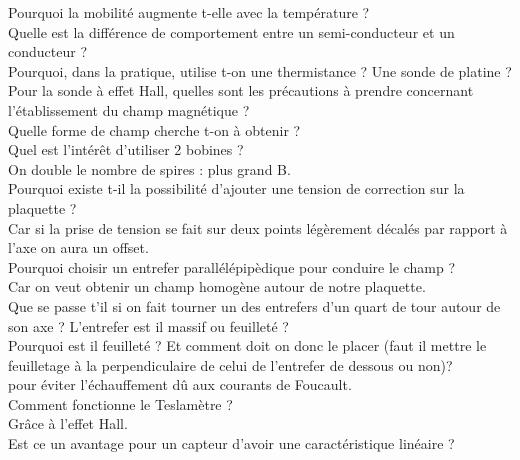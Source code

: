 \documentclass[12pt,prb,aps,epsf]{report}
\begin{document}
Pourquoi la mobilité augmente t-elle avec la température ?\\

Quelle est la différence de comportement entre un semi-conducteur et un conducteur ?\\

Pourquoi, dans la pratique, utilise t-on une thermistance ? Une sonde de platine ?\\

Pour la sonde à effet Hall, quelles sont les précautions à prendre concernant l'établissement du champ magnétique ?\\

Quelle forme de champ cherche t-on à obtenir ?\\

Quel est l'intérêt d'utiliser 2 bobines ?\\
On double le nombre de spires : plus grand B.\\

Pourquoi existe t-il la possibilité d'ajouter une tension de correction sur la plaquette ?\\
Car si la prise de tension se fait sur deux points légèrement décalés par rapport à l'axe on aura un offset.\\

Pourquoi choisir un entrefer parallélépipèdique pour conduire le champ ?\\
Car on veut obtenir un champ homogène autour de notre plaquette.\\

Que se passe t'il si on fait tourner un des entrefers d'un quart de tour autour de son axe ? L'entrefer est il massif ou feuilleté ?\\

Pourquoi est il feuilleté ? Et comment doit on donc le placer (faut il mettre le feuilletage à la perpendiculaire de celui de l'entrefer de dessous ou non)?\\
pour éviter l'échauffement dû aux courants de Foucault.\\

Comment fonctionne le Teslamètre ?\\
Grâce à l'effet Hall.\\

Est ce un avantage pour un capteur d'avoir une caractéristique linéaire ? \\
\end{document}
